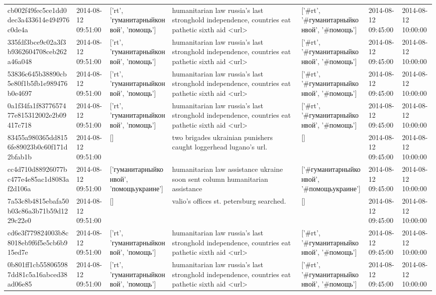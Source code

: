 \begin{tabular}{lllllll}
cb002f49fec5ce1dd0dec3a433614e494976c0de4a & 2014-08-12 09:51:00 & ['rt', 'гуманитарныйконвой', 'помощь'] & humanitarian law russia's last stronghold independence, countries eat pathetic sixth aid <url> & ['#rt', '#гуманитарныйконвой', '#помощь'] & 2014-08-12 09:45:00 & 2014-08-12 10:00:00 \\
335fdf3bce9c02a3f3b9362604708ceb262a46a048 & 2014-08-12 09:51:00 & ['rt', 'гуманитарныйконвой', 'помощь'] & humanitarian law russia's last stronghold independence, countries eat pathetic sixth aid <url> & ['#rt', '#гуманитарныйконвой', '#помощь'] & 2014-08-12 09:45:00 & 2014-08-12 10:00:00 \\
53836c645b38890cb5e80f1b5fb1e989476b0e4697 & 2014-08-12 09:51:00 & ['rt', 'гуманитарныйконвой', 'помощь'] & humanitarian law russia's last stronghold independence, countries eat pathetic sixth aid <url> & ['#rt', '#гуманитарныйконвой', '#помощь'] & 2014-08-12 09:45:00 & 2014-08-12 10:00:00 \\
0a1f34fa1f8377657477e815312002e2b09417c718 & 2014-08-12 09:51:00 & ['rt', 'гуманитарныйконвой', 'помощь'] & humanitarian law russia's last stronghold independence, countries eat pathetic sixth aid <url> & ['#rt', '#гуманитарныйконвой', '#помощь'] & 2014-08-12 09:45:00 & 2014-08-12 10:00:00 \\
83455a980365dd8156fe89023b0c60f171d2bfab1b & 2014-08-12 09:51:00 & [] & two brigades ukrainian punishers caught loggerhead lugano's url. & [] & 2014-08-12 09:45:00 & 2014-08-12 10:00:00 \\
cc4d710d88926077bc477e4e85ac1d8083af2d106a & 2014-08-12 09:51:00 & ['гуманитарныйконвой', 'помощьукраине'] & humanitarian law assistance ukraine soon sent column humanitarian assistance & ['#гуманитарныйконвой', '#помощьукраине'] & 2014-08-12 09:45:00 & 2014-08-12 10:00:00 \\
7a53c8b4815ebafa50b03c86a3b71b59d1229c22e0 & 2014-08-12 09:51:00 & [] & valio's offices st. petersburg searched. & [] & 2014-08-12 09:45:00 & 2014-08-12 10:00:00 \\
cd6e3f779824003b8c8018eb9f6f5e5cb6b915ed7e & 2014-08-12 09:51:00 & ['rt', 'гуманитарныйконвой', 'помощь'] & humanitarian law russia's last stronghold independence, countries eat pathetic sixth aid <url> & ['#rt', '#гуманитарныйконвой', '#помощь'] & 2014-08-12 09:45:00 & 2014-08-12 10:00:00 \\
0b801ff1cb558065987dd81c5a16abced38ad06e85 & 2014-08-12 09:51:00 & ['rt', 'гуманитарныйконвой', 'помощь'] & humanitarian law russia's last stronghold independence, countries eat pathetic sixth aid <url> & ['#rt', '#гуманитарныйконвой', '#помощь'] & 2014-08-12 09:45:00 & 2014-08-12 10:00:00 \\

\end{tabular}
